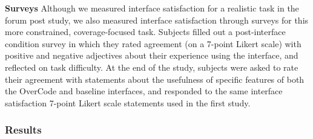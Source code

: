 {\bf Surveys} Although we measured interface satisfaction for a realistic task in the forum post study, we also measured interface satisfaction through surveys for this more constrained, coverage-focused task. Subjects filled out a post-interface condition survey in which they rated agreement (on a 7-point Likert scale) with positive and negative adjectives about their experience using the interface, and reflected on task difficulty. At the end of the study, subjects were asked to rate their agreement with statements about the usefulness of specific features of both the OverCode and baseline interfaces, and responded to the same interface satisfaction 7-point Likert scale statements used in the first study.

\subsubsection{Results} \label{coverageResults}
